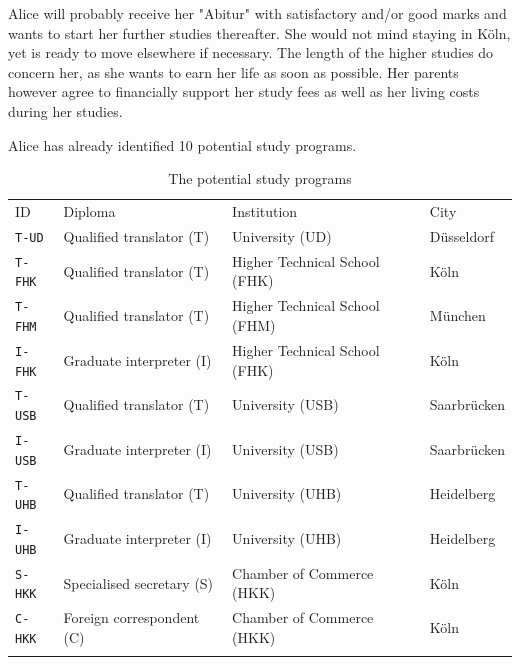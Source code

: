 Alice will probably receive her "Abitur" with satisfactory and/or good marks and  wants to start her further studies thereafter. She would not mind staying in Köln, yet is ready to move elsewhere if necessary. The length of the higher studies do concern her, as she wants to earn her life as soon as possible.  Her parents however agree to financially support her study fees as well as her living costs during her studies.

Alice has already identified 10 potential study programs.
\begin{table}[h]
\caption{The potential study programs}
\label{tab:12.1}       %
\begin{center}
    \begin{tabular}{l|l|l|l}
      \svhline\noalign{\smallskip}
      ID & Diploma & Institution & City\\
      \noalign{\smallskip}\hline\noalign{\smallskip}
      \texttt{T-UD}   & Qualified translator (T)  &   University (UD)               &  Düsseldorf\\
      \texttt{T-FHK}  & Qualified translator (T)  &   Higher Technical School (FHK) &  Köln\\
      \texttt{T-FHM}  & Qualified translator (T)  &   Higher Technical School (FHM) &  München\\
      \texttt{I-FHK}  & Graduate interpreter (I)  &   Higher Technical School (FHK) &  Köln\\
      \texttt{T-USB}  & Qualified translator (T)  &   University (USB)              &  Saarbrücken\\
      \texttt{I-USB}  & Graduate interpreter (I)  &   University (USB)              &  Saarbrücken\\
      \texttt{T-UHB}  & Qualified translator (T)  &   University (UHB)              &  Heidelberg\\
      \texttt{I-UHB}  & Graduate interpreter (I)  &   University (UHB)              &  Heidelberg\\
      \texttt{S-HKK}  & Specialised secretary (S) &   Chamber of Commerce (HKK)     &  Köln\\
      \texttt{C-HKK}  & Foreign correspondent (C) &   Chamber of Commerce (HKK)     &  Köln\\
      \noalign{\smallskip}\hline
    \end{tabular}
\end{center}
\end{table}

